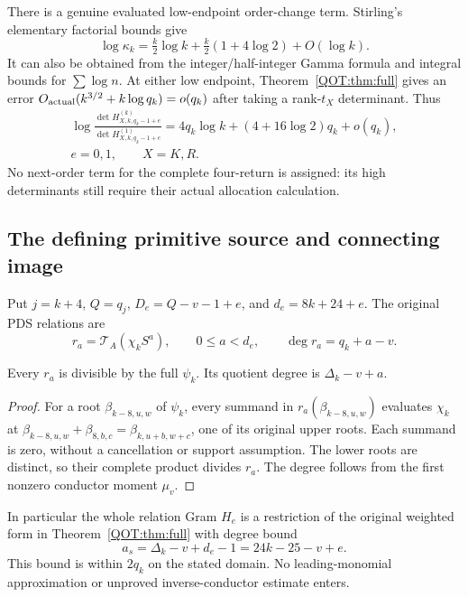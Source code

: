 \documentclass[11pt,a4paper]{article}
\begin{document}
There is a genuine evaluated low-endpoint order-change term. Stirling's elementary factorial bounds give
\begin{equation}
 \log\kappa_k=\tfrac{k}{2}\log k+\tfrac{k}{2}(1+4\log2)+O(\log k).
 \label{QOT:eq:kappaasym}
\tag{QOT23}
\end{equation}
It can also be obtained from the integer/half-integer Gamma formula and integral bounds for $\sum\log n$. At either low endpoint, Theorem~\ref{QOT:thm:full} gives an error $O_{\rm actual}(k^{3/2}+k\log q_k)=o(q_k)$ after taking a rank-$t_X$ determinant. Thus
\begin{equation}
\boxed{\begin{gathered}
 \log\frac{\det H_{X,k,q_k-1+e}^{(k)}}{
                 \det H_{X,k,q_k-1+e}^{(1)}}
 =4q_k\log k+(4+16\log2)q_k+o(q_k),\\
 e=0,1,\qquad X=K,R.
\end{gathered}}
\label{QOT:eq:lowprimal}
\tag{QOT24}
\end{equation}
No next-order term for the complete four-return is assigned: its high determinants still require their actual allocation calculation.

\subsection{The defining primitive source and connecting image}
Put $j=k+4$, $Q=q_j$, $D_e=Q-v-1+e$, and $d_e=8k+24+e$. The original PDS relations are
\[
 r_a=\mathcal T_A(\chi_k S^a),\qquad 0\le a<d_e,
 \qquad \deg r_a=q_k+a-v.
\]
\begin{QOTlemma}\label{QOT:lem:divide}
Every $r_a$ is divisible by the full $\psi_k$. Its quotient degree is $\Delta_k-v+a$.
\end{QOTlemma}
\begin{proof}
For a root $\beta_{k-8,u,w}$ of $\psi_k$, every summand in $r_a(\beta_{k-8,u,w})$ evaluates $\chi_k$ at
$\beta_{k-8,u,w}+\beta_{8,b,c}=\beta_{k,u+b,w+c}$, one of its original upper roots. Each summand is zero, without a cancellation or support assumption. The lower roots are distinct, so their complete product divides $r_a$. The degree follows from the first nonzero conductor moment $\mu_v$.
\end{proof}
In particular the whole relation Gram $H_e$ is a restriction of the original weighted form in Theorem~\ref{QOT:thm:full} with degree bound
\begin{equation}
 a_s=\Delta_k-v+d_e-1=24k-25-v+e .
 \label{QOT:eq:asrc}
\tag{QOT25}
\end{equation}
This bound is within $2q_k$ on the stated domain. No leading-monomial approximation or unproved inverse-conductor estimate enters.
\end{document}
